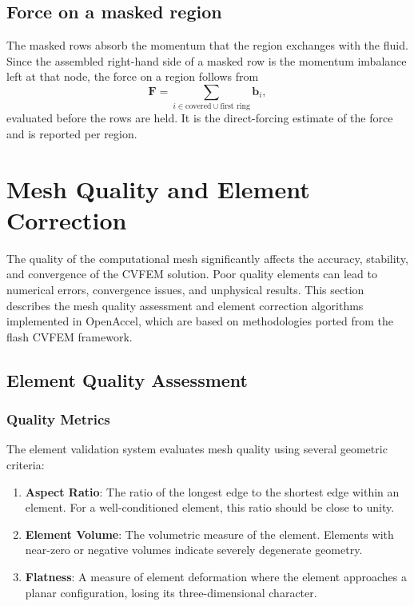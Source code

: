 \documentclass[12pt]{extarticle}
\newcommand{\<}{\langle}
\renewcommand{\>}{\rangle}
\theoremstyle{definition}
\begin{document}
\subsection{Force on a masked region}

The masked rows absorb the momentum that the region exchanges with the fluid. Since
the assembled right-hand side of a masked row is the momentum imbalance left at
that node, the force on a region follows from
\begin{equation}
    \mathbf{F} = \sum_{i \in \text{covered} \cup \text{first ring}} \mathbf{b}_i,
\end{equation}
evaluated before the rows are held. It is the direct-forcing estimate of the
force and is reported per region.


\section{Mesh Quality and Element Correction}

The quality of the computational mesh significantly affects the accuracy, stability, and convergence of the CVFEM solution. Poor quality elements can lead to numerical errors, convergence issues, and unphysical results. This section describes the mesh quality assessment and element correction algorithms implemented in OpenAccel, which are based on methodologies ported from the flash CVFEM framework.

\subsection{Element Quality Assessment}

\subsubsection{Quality Metrics}

The element validation system evaluates mesh quality using several geometric criteria:

\begin{enumerate}
    \item \textbf{Aspect Ratio}: The ratio of the longest edge to the shortest edge within an element. For a well-conditioned element, this ratio should be close to unity.
    
    \item \textbf{Element Volume}: The volumetric measure of the element. Elements with near-zero or negative volumes indicate severely degenerate geometry.
    
    \item \textbf{Flatness}: A measure of element deformation where the element approaches a planar configuration, losing its three-dimensional character.
\end{enumerate}
\end{document}
